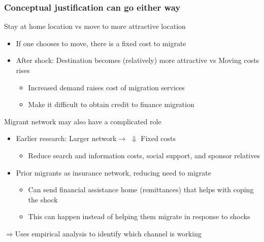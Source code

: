 \documentclass[aspectratio=169]{beamer}
\begin{document}
\begin{frame}
\frametitle{Conceptual justification can go either way} 
Stay at home location vs move to more attractive location
\begin{itemize}\setlength\itemsep{3pt}
\item If one chooses to move, there is a fixed cost to migrate
\item After shock: Destination becomes (relatively) more attractive vs Moving costs rises
\begin{itemize}\setlength\itemsep{3pt}
\item Increased demand raises cost of migration services
\item Make it difficult to obtain credit to finance migration
\end{itemize}
\end{itemize}\medskip
Migrant network may also have a complicated role
\begin{itemize}\setlength\itemsep{3pt}
\item Earlier research: Larger network$\to$ $\Downarrow$ Fixed costs
\begin{itemize}
\item Reduce search and information costs, social support, and sponsor relatives 
\end{itemize}
\item Prior migrants as insurance network, reducing need to migrate
\begin{itemize}\setlength\itemsep{3pt}
\item Can send financial assistance home (remittances) that helps with coping the shock
\item This can happen instead of helping them migrate in response to shocks
\end{itemize}
\end{itemize}\medskip
$\Rightarrow$Uses empirical analysis to identify which channel is working
\end{frame}
\end{document}
